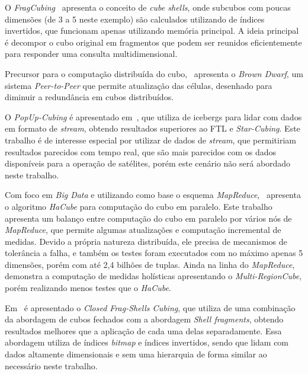 {\color{cerulean}
O \textit{FragCubing}~\cite{liHighdimensionalOLAPMinimal2004} apresenta o conceito de \textit{cube shells}, onde subcubos com poucas dimensões (de 3 a 5 neste exemplo) são calculados utilizando de índices invertidos, que funcionam apenas utilizando memória principal.
A ideia principal é decompor o cubo original em fragmentos que podem ser reunidos eficientemente para responder uma consulta multidimensional.
}

Precursor para o computação distribuída do cubo,~\cite{dokaBrownDwarfFullydistributed2011} apresenta o \textit{Brown Dwarf}, um sistema \textit{Peer-to-Peer} que permite atualização das células, desenhado para diminuir a redundância em cubos distribuídos.

O \textit{PopUp-Cubing} é apresentado em~\cite{heinePopUpCubingAlgorithmEfficiently2017}, que utiliza de icebergs para lidar com dados em formato de \textit{stream}, obtendo resultados superiores ao FTL e \textit{Star-Cubing}.
{\color{cerulean}
Este trabalho é de interesse especial por utilizar de dados de \textit{stream}, que permitiriam resultados parecidos com tempo real, que são mais parecidos com os dados disponíveis para a operação de satélites, porém este cenário não será abordado neste trabalho.
}

Com foco em \textit{Big Data} e utilizando como base o esquema \textit{MapReduce},~\cite{wangScalableDataCube2013} apresenta o algoritmo \textit{HaCube} para computação do cubo em paralelo.
Este trabalho apresenta um balanço entre computação do cubo em paralelo por vários nós de \textit{MapReduce}, que permite algumas atualizações e computação incremental de medidas.
Devido a própria natureza distribuída, ele precisa de mecanismos de tolerância a falha, e também os testes foram executados com no máximo apenas 5 dimensões, porém com até 2,4 bilhões de tuplas.
Ainda na linha do \textit{MapReduce},~\cite{yangHolisticAlgebraicData2017} demonstra a computação de medidas holísticas apresentando o \textit{Multi-RegionCube}, porém realizando menos testes que o \textit{HaCube}.

Em~\cite{zhaoClosedFragShellsCubing2018} é apresentado o \textit{Closed Frag-Shells Cubing}, que utiliza de uma combinação da abordagem de cubos fechados com a abordagem \textit{Shell fragments}, obtendo resultados melhores que a aplicação de cada uma delas separadamente.
Essa abordagem utiliza de índices \textit{bitmap} e índices invertidos, sendo que lidam com dados altamente dimensionais e sem uma hierarquia de forma similar ao necessário neste trabalho.

